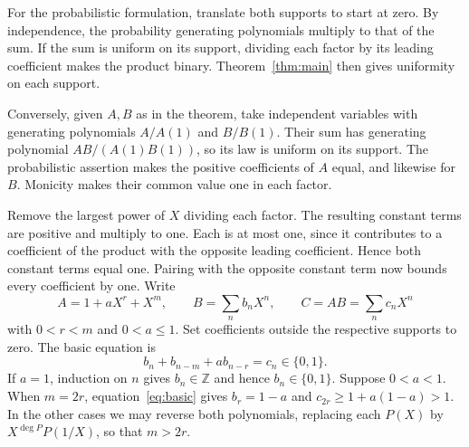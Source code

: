\documentclass[11pt,reqno]{amsart}
\numberwithin{equation}{section}
\newcommand{\Z}{\mathbb Z}
\begin{document}
For the probabilistic formulation, translate both supports to start at zero. By independence, the probability generating polynomials multiply to that of the sum. If the sum is uniform on its support, dividing each factor by its leading coefficient makes the product binary. Theorem~\ref{thm:main} then gives uniformity on each support.

Conversely, given $A,B$ as in the theorem, take independent variables with generating polynomials $A/A(1)$ and $B/B(1)$. Their sum has generating polynomial $AB/(A(1)B(1))$, so its law is uniform on its support. The probabilistic assertion makes the positive coefficients of $A$ equal, and likewise for $B$. Monicity makes their common value one in each factor.

Remove the largest power of $X$ dividing each factor. The resulting constant terms are positive and multiply to one. Each is at most one, since it contributes to a coefficient of the product with the opposite leading coefficient. Hence both constant terms equal one. Pairing with the opposite constant term now bounds every coefficient by one. Write
\[
 A=1+aX^r+X^m,\qquad B=\sum_n b_nX^n,\qquad C=AB=\sum_n c_nX^n
\]
with $0<r<m$ and $0<a\le1$. Set coefficients outside the respective supports to zero. The basic equation is
\begin{equation}\label{eq:basic}
 b_n+b_{n-m}+a b_{n-r}=c_n\in\{0,1\}.
\end{equation}
If $a=1$, induction on $n$ gives $b_n\in\Z$ and hence $b_n\in\{0,1\}$. Suppose $0<a<1$. When $m=2r$, equation~\eqref{eq:basic} gives $b_r=1-a$ and $c_{2r}\ge1+a(1-a)>1$. In the other cases we may reverse both polynomials, replacing each $P(X)$ by $X^{\deg P}P(1/X)$, so that $m>2r$.
\end{document}
